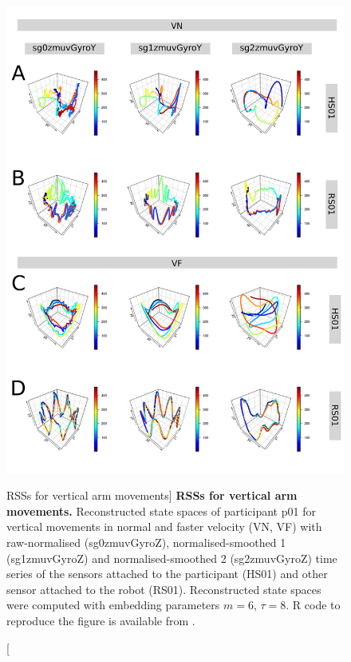 \begin{figure}
\centering
\includegraphics[height=0.85\textheight]{rss_aV}
    \caption
	[RSSs for vertical arm movements]{
	{\bf RSSs for vertical arm movements.}
	Reconstructed state spaces %
	of participant p01 for vertical movements in normal and faster 
	velocity (VN, VF) with raw-normalised (sg0zmuvGyroZ), 
	normalised-smoothed 1 (sg1zmuvGyroZ) and 
	normalised-smoothed 2 (sg2zmuvGyroZ) time series of the 
	sensors attached to the participant (HS01) and other sensor 
	attached to the robot (RS01).	
	Reconstructed state spaces were computed with 
	embedding parameters $m=6$, $\tau=8$.
	R code to reproduce the figure is available from \cite{hwum2018}.
        }
    \label{fig:rss_aVw10}
\end{figure}

